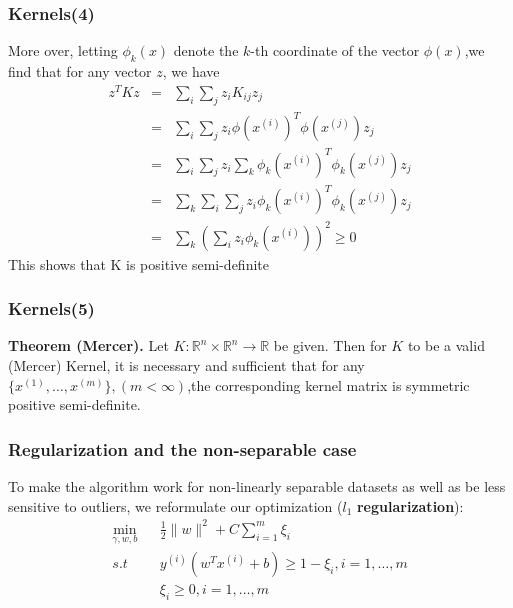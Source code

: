 \documentclass[slidestop,compress,mathserif]{beamer}
\begin{document}
    \begin{frame}[shrink]
    	\frametitle{Kernels(4)}
    	 More over, letting $\phi_k(x)$
   	    denote the $k$-th coordinate of the vector $\phi(x)$,we find
   	    that for any vector $z$, we have
   	    \begin{eqnarray*}
   	    	z^TKz &=& \sum_i\sum_jz_iK_{ij}z_j\\
   	    	&=& \sum_i\sum_jz_i\phi(x^{(i)})^T\phi(x^{(j)})z_j\\
   	    	&=& \sum_i\sum_jz_i\sum_k\phi_k(x^{(i)})^T\phi_k(x^{(j)})
   	    	z_j\\
   	    	&=& \sum_k\sum_i\sum_jz_i\phi_k(x^{(i)})^T\phi_k(x^{(j)})
   	    	z_j\\
   	    	&=& \sum_k\left(\sum_iz_i\phi_k(x^{(i)})\right)^2 \ge 0
   	    \end{eqnarray*}
   	    This shows that K is positive semi-definite
   	    $$$$    	
    \end{frame}
    \begin{frame}
    	\frametitle{Kernels(5)}
    	\textbf{Theorem (Mercer).} Let $K:\mathbb{R}^n\times
    	\mathbb{R}^n\rightarrow\mathbb{R}$ be given. Then for
    	$K$ to be a valid (Mercer) Kernel, it is necessary and 
    	sufficient that for any $\{x^{(1)},\ldots,x^{(m)}\},
    	(m<\infty)$,the corresponding kernel matrix is symmetric
    	positive semi-definite.
    \end{frame}
    \begin{frame}[shrink]
    	\frametitle{Regularization and the non-separable case}
    	\begin{figure}
        \end{figure}
        To make the algorithm work for non-linearly separable 
        datasets as well as be less sensitive to outliers, we
        reformulate our optimization ($l_1$ \textbf{regularization}):
        \begin{eqnarray*}
        	\min_{\gamma,w,b} && \frac{1}{2}\|w\|^2+C\sum_{i=1}^m\xi_i\\
        	s.t && y^{(i)}(w^Tx^{(i)}+b)\ge 1-\xi_i,i=1,\ldots,m\\
        	&& \xi_i \ge 0,i=1,\ldots,m
        \end{eqnarray*}
        
        
    \end{frame}
\end{document}

